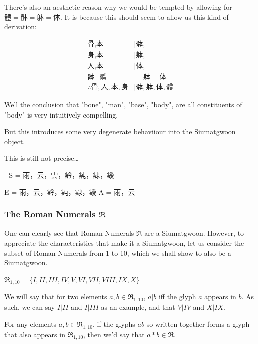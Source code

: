 There's also an aesthetic reason why we would be tempted by allowing for $\text{體} = \text{骵} = \text{躰} = \text{体}$. It is because this should seem to allow us this kind of derivation: 

\begin{align}
    \text{骨}, \text{本} &| \text{骵}, \\
    \text{身}, \text{本} &| \text{躰}, \\
    \text{人}, \text{本} &| \text{体}, \\       
    \text{骵} = \text{體} &= \text{躰} = \text{体} \\
    \therefore \text{骨}, \text{人}, \text{本}, \text{身} &| \text{骵}, \text{躰}, \text{体}, \text{體} 
\end{align}

Well the conclusion that "bone", "man", "base", "body", are all constituents of "body" is very intuitively compelling. 

But this introduces some very degenerate behaviiour into the Siumatgwoon object.






This is still not precise…

- S = {雨，云，雲，霒，霕，霴，靉}
    
    E = {雨，云，霒，霕，霴，靉} 
    A =  {雨，云}








\subsubsection{The Roman Numerals $\mathfrak{R}$}

One can clearly see that Roman Numerals $\mathfrak{R}$ are a Siumatgwoon. However, to appreciate the characteristics that make it a Siumatgwoon, let us consider the subset of Roman Numerals from 1 to 10, which we shall show to also be a Siumatgwoon.

$\mathfrak{R}_{1,10} = \{I, II, III, IV, V, VI, VII, VIII, IX, X\}$

We will say that for two elements $a,b \in \mathfrak{R}_{1,10}$, $a|b$ iff the glyph $a$ appears in $b$. As such, we can say $I | II$ and $I|III$ as an example, and that $V|IV$ and $X|IX$. 

For any elements $a,b\in \mathfrak{R}_{1,10}$, if the glyphs $ab$ so written together forms a glyph that also appears in $\mathfrak{R}_{1,10}$, then we'd say that $a*b\in \mathfrak{R}$.

